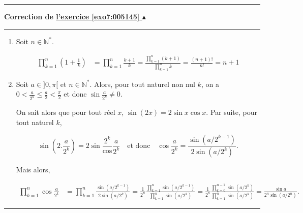 \documentclass[11pt,a4paper]{article}
\newcommand{\Nn}{\mathbb{N}} \newcommand{\N}{\mathbb{N}}
\newcounter{exo}
\newcommand{\correction}[1]{\hypertarget{cor7:#1}{}\label{cor7:#1}{\bf Correction de \hyperlink{exo7:#1}{l'exercice \ref{exo7:#1} $\blacktriangle$}}\vspace{1mm}\hrule\vspace{1mm}}
\newcommand{\fincorrection}{\vspace{1mm}\hrule\vspace*{7mm}}
\begin{document}
\fincorrection
\correction{005145}
\begin{enumerate}
\item  Soit $n\in\Nn^*$.

\begin{align*}
\prod_{k=1}^{n}(1+\frac{1}{k})&=\prod_{k=1}^{n}\frac{k+1}{k}=\frac{\prod_{k=1}^{n}(k+1)}{\prod_{k=1}^{n}k}=\frac{(n+1)!}
{n!}=n+1
\end{align*}

\item  Soit $a\in]0,\pi[$ et $n\in\Nn^*$. Alors, pour tout naturel non nul $k$, on a
$0<\frac{a}{2^k}\leq\frac{a}{2}<\frac{\pi}{2}$ et donc $\sin\frac{a}{2^k}\neq0$.

On sait alors que pour tout réel $x$, $\sin(2x)=2\sin x\cos x$. Par suite, pour tout naturel $k$,

$$\sin(2.\frac{a}{2^k})=2\sin\frac{2^k}\cos\frac{a}{2^k}\quad\mbox{et donc}\quad
\cos\frac{a}{2^k}=\frac{\sin(a/2^{k-1})}{2\sin(a/2^k)}.$$

Mais alors,

\begin{align*}
\prod_{k=1}^{n}\cos\frac{a}{2^k}&=\prod_{k=1}^{n}\frac{\sin(a/2^{k-1})}{2\sin(a/2^k)}=\frac{1}{2^n}\frac{\prod_{k=1}^{n
}\sin(a/2^{k-1})}{\prod_{k=1}^{n}\sin(a/2^{k})}
 =\frac{1}{2^n}\frac{\prod_{k=0}^{n-1}
\sin(a/2^{k})}{\prod_{k=1}^{n}\sin(a/2^{k})}
=\frac{\sin a}{2^n\sin(a/2^n)}.
\end{align*}
\end{enumerate}
\fincorrection
\end{document}
